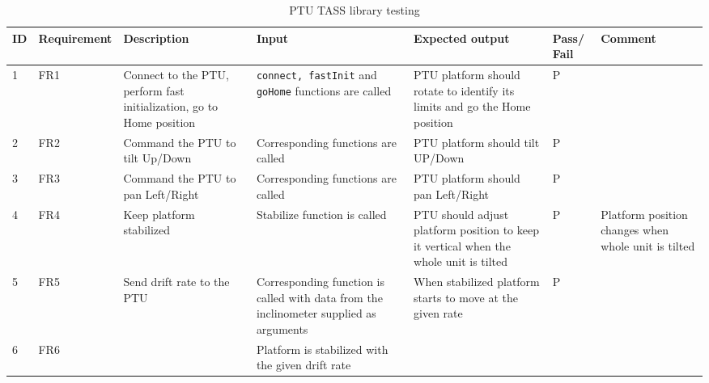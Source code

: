 \begin{landscape}
\begin{center}
\begin{table}[h]

\begin{tabular}{|p{0.3cm}|p{2cm}|p{4cm}|p{4cm}|p{5.4cm}|p{0.9cm}|p{4cm}|}
\hline
ID &  Requirement & Description &  Input &  Expected output & Pass/ Fail & Comment  \\ \hline
1& FR1 & Connect to the PTU, perform fast initialization, go to Home position& \texttt{connect, fastInit} and \texttt{goHome} functions are called &  PTU platform should rotate to identify its limits and go the Home position&P &  \\ \hline
2& FR2& Command the PTU to tilt Up/Down& Corresponding functions are called& PTU platform should tilt UP/Down& P&  \\ \hline
3& FR3& Command the PTU to pan Left/Right& Corresponding functions are called& PTU platform should pan Left/Right& P& \\ \hline
4& FR4& Keep platform stabilized& Stabilize function is called& PTU should adjust platform position to keep it vertical when the whole unit is tilted& P& Platform position changes when whole unit is tilted\\ \hline
5& FR5& Send drift rate to the PTU & Corresponding function is called with data from the inclinometer supplied as arguments& When stabilized platform starts to move at the given rate & P&  \\ \hline
6 & FR6 &  & Platform is stabilized with the given drift rate  &  &  &\\ \hline

\end{tabular}
\caption {PTU TASS library testing} \label{tab:PTUlibraryTestingTable}
\end{table}
\end{center}
\end{landscape}

